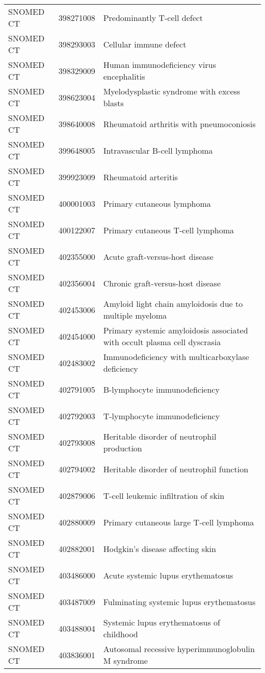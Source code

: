 \begin{longtable}{p{}p{}p{}}
  SNOMED CT & 398271008 & Predominantly T-cell defect \\ 
  SNOMED CT & 398293003 & Cellular immune defect \\ 
  SNOMED CT & 398329009 & Human immunodeficiency virus encephalitis \\ 
  SNOMED CT & 398623004 & Myelodysplastic syndrome with excess blasts \\ 
  SNOMED CT & 398640008 & Rheumatoid arthritis with pneumoconiosis \\ 
  SNOMED CT & 399648005 & Intravascular B-cell lymphoma \\ 
  SNOMED CT & 399923009 & Rheumatoid arteritis \\ 
  SNOMED CT & 400001003 & Primary cutaneous lymphoma \\ 
  SNOMED CT & 400122007 & Primary cutaneous T-cell lymphoma \\ 
  SNOMED CT & 402355000 & Acute graft-versus-host disease \\ 
  SNOMED CT & 402356004 & Chronic graft-versus-host disease \\ 
  SNOMED CT & 402453006 & Amyloid light chain amyloidosis due to multiple myeloma \\ 
  SNOMED CT & 402454000 & Primary systemic amyloidosis associated with occult plasma cell dyscrasia \\ 
  SNOMED CT & 402483002 & Immunodeficiency with multicarboxylase deficiency \\ 
  SNOMED CT & 402791005 & B-lymphocyte immunodeficiency \\ 
  SNOMED CT & 402792003 & T-lymphocyte immunodeficiency \\ 
  SNOMED CT & 402793008 & Heritable disorder of neutrophil production \\ 
  SNOMED CT & 402794002 & Heritable disorder of neutrophil function \\ 
  SNOMED CT & 402879006 & T-cell leukemic infiltration of skin \\ 
  SNOMED CT & 402880009 & Primary cutaneous large T-cell lymphoma \\ 
  SNOMED CT & 402882001 & Hodgkin's disease affecting skin \\ 
  SNOMED CT & 403486000 & Acute systemic lupus erythematosus \\ 
  SNOMED CT & 403487009 & Fulminating systemic lupus erythematosus \\ 
  SNOMED CT & 403488004 & Systemic lupus erythematosus of childhood \\ 
  SNOMED CT & 403836001 & Autosomal recessive hyperimmunoglobulin M syndrome \\ 

\end{longtable}
